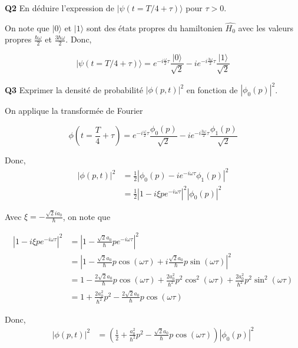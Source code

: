 \documentclass[french]{article}
\begin{document}
	\begin{tcolorbox}[colback=gray!5!white,colframe=gray!75!black]
		\textbf{\large{Q2}} En déduire l'expression de $|\psi(t = T/4 + \tau)\rangle$ pour $\tau > 0$.
	\end{tcolorbox}

	On note que $|0\rangle$ et $|1\rangle$ sont des états propres du hamiltonien $\hat{H_0}$ avec les valeurs propres $\frac{\hbar \omega}{2}$ et $\frac{3 \hbar \omega}{2}$. Donc,

	\[|\psi(t = T/4 + \tau)\rangle = e^{-i\frac{\omega}{2}\tau}\frac{|0\rangle}{\sqrt{2}} - i e^{-i\frac{3\omega}{2}\tau}\frac{|1\rangle}{\sqrt{2}}\]

	\begin{tcolorbox}[colback=gray!5!white,colframe=gray!75!black]
		\textbf{\large{Q3}} Exprimer la densité de probabilité $|\phi(p,t)|^2$ en fonction de $|\phi_0(p)|^2$.
	\end{tcolorbox}

	On applique la transformée de Fourier
	
	\[\phi(t = \frac{T}{4}+\tau) = e^{-i\frac{\omega}{2}\tau}\frac{\phi_0(p)}{\sqrt{2}} - i e^{-i\frac{3\omega}{2}\tau}\frac{\phi_1(p)}{\sqrt{2}}\]
	
	Donc,
	\begin{align}
		|\phi(p, t)|^2 &= \frac{1}{2}\left|\phi_0(p) - ie^{-i\omega\tau}\phi_1(p)\right|^2\\
		&= \frac{1}{2}\left|1 - i\xi pe^{-i\omega\tau}\right|^2 |\phi_0(p)|^2
	\end{align}
	
	Avec $\xi = -\frac{\sqrt{2}ia_0}{\hbar}$, on note que
	
	\begin{align}
		\left|1 - i\xi pe^{-i\omega\tau}\right|^2 &= \left|  1 - \frac{\sqrt{2}a_0}{\hbar}pe^{-i\omega\tau} \right|^2\\
		&= \left|  1 - \frac{\sqrt{2}a_0}{\hbar}p\cos(\omega \tau) + i\frac{\sqrt{2}a_0}{\hbar}p\sin(\omega \tau) \right|^2\\
		&= 1 - \frac{2\sqrt{2}a_0}{\hbar}p\cos(\omega \tau) + \frac{2a_0^2}{\hbar^2}p^2\cos^2(\omega \tau) +  \frac{2a_0^2}{\hbar^2}p^2\sin^2(\omega \tau)\\
		&= 1 + \frac{2a_0^2}{\hbar^2}p^2 - \frac{2\sqrt{2}a_0}{\hbar}p\cos(\omega \tau)
	\end{align}
	
	Donc, 
	\begin{align}
	|\phi(p, t)|^2 &= \left(\frac{1}{2} + \frac{a_0^2}{\hbar^2}p^2 - \frac{\sqrt{2}a_0}{\hbar}p\cos(\omega \tau)\right) |\phi_0(p)|^2
	\end{align}
\end{document}

